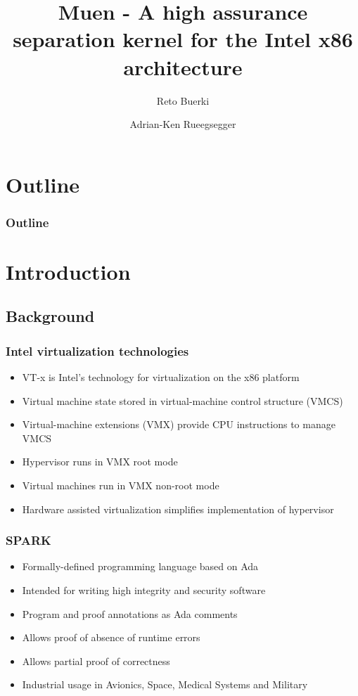 \documentclass[xcolor={dvipsnames}]{beamer}
\title[Muen Separation Kernel]{Muen - A high assurance separation kernel for the Intel x86 architecture}
\author{Reto Buerki \and Adrian-Ken Rueegsegger}
\institute[HSR]
{
	Institute for Internet Technologies and Applications\\
	University of Applied Sciences Rapperswil
}
\begin{document}


\begin{frame}
	\titlepage
\end{frame}

\section*{Outline}
\begin{frame}
	\frametitle{Outline}\tableofcontents
\end{frame}

\section{Introduction}
\subsection{Background}
\begin{frame}\frametitle{Intel virtualization technologies}
\begin{itemize}
	\item VT-x is Intel's technology for virtualization on the x86 platform
	\item Virtual machine state stored in virtual-machine control structure (VMCS)
	\item Virtual-machine extensions (VMX) provide CPU instructions to manage VMCS
	\item Hypervisor runs in VMX root mode
	\item Virtual machines run in VMX non-root mode
	\item Hardware assisted virtualization simplifies implementation of hypervisor
\end{itemize}
\end{frame}

\begin{frame}[fragile]\frametitle{SPARK}
\begin{itemize}
	\item Formally-defined programming language based on Ada
	\item Intended for writing high integrity and security software
	\item Program and proof annotations as Ada comments
	\item Allows proof of absence of runtime errors
	\item Allows partial proof of correctness
	\item Industrial usage in Avionics, Space, Medical Systems and Military
\end{itemize}


\end{frame}
\end{document}
